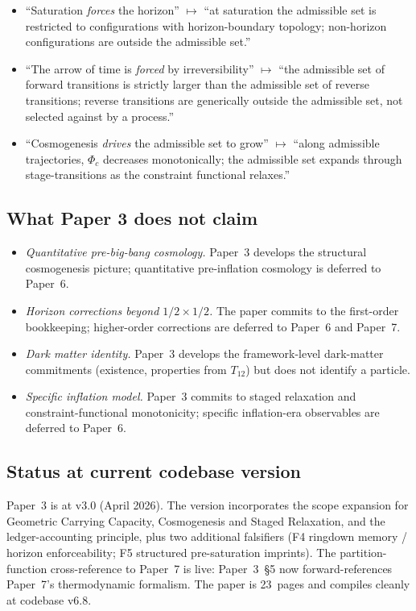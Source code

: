 \documentclass[11pt]{article}
\begin{document}
\begin{itemize}
    \item ``Saturation \emph{forces} the horizon'' $\longmapsto$ ``at saturation the admissible set is restricted to configurations with horizon-boundary topology; non-horizon configurations are outside the admissible set.''
    \item ``The arrow of time is \emph{forced} by irreversibility'' $\longmapsto$ ``the admissible set of forward transitions is strictly larger than the admissible set of reverse transitions; reverse transitions are generically outside the admissible set, not selected against by a process.''
    \item ``Cosmogenesis \emph{drives} the admissible set to grow'' $\longmapsto$ ``along admissible trajectories, $\Phi_c$ decreases monotonically; the admissible set expands through stage-transitions as the constraint functional relaxes.''
\end{itemize}

\subsection{What Paper 3 does not claim}\label{sec:P3_does_not_claim}

\begin{itemize}
    \item \emph{Quantitative pre-big-bang cosmology.} Paper~3 develops the structural cosmogenesis picture; quantitative pre-inflation cosmology is deferred to Paper~6.
    \item \emph{Horizon corrections beyond $1/2 \times 1/2$.} The paper commits to the first-order bookkeeping; higher-order corrections are deferred to Paper~6 and Paper~7.
    \item \emph{Dark matter identity.} Paper~3 develops the framework-level dark-matter commitments (existence, properties from $T_{12}$) but does not identify a particle.
    \item \emph{Specific inflation model.} Paper~3 commits to staged relaxation and constraint-functional monotonicity; specific inflation-era observables are deferred to Paper~6.
\end{itemize}

\subsection{Status at current codebase version}\label{sec:P3_status}

Paper~3 is at v3.0 (April 2026). The version incorporates the scope expansion for Geometric Carrying Capacity, Cosmogenesis and Staged Relaxation, and the ledger-accounting principle, plus two additional falsifiers (F4 ringdown memory / horizon enforceability; F5 structured pre-saturation imprints). The partition-function cross-reference to Paper~7 is live: Paper~3~\S5 now forward-references Paper~7's thermodynamic formalism. The paper is 23~pages and compiles cleanly at codebase v6.8.
\end{document}
